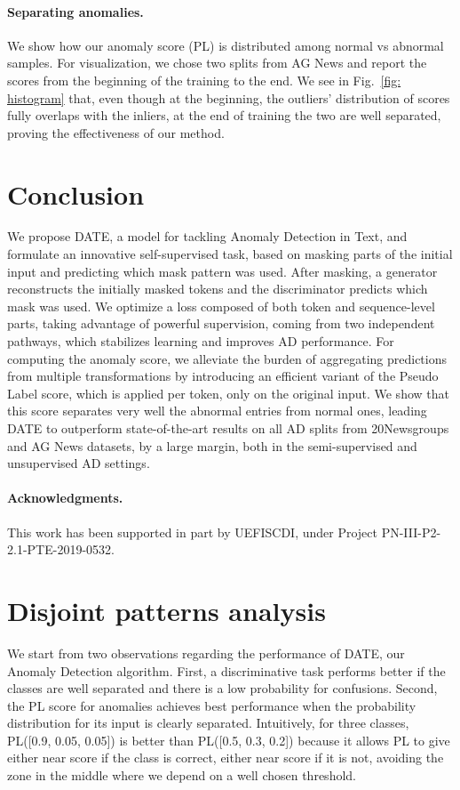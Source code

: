 \documentclass[11pt]{article}
\begin{document}
\paragraph{Separating anomalies.} We show how our anomaly score (PL) is distributed among normal vs abnormal samples. For visualization, we chose two splits from AG News and report the scores from the beginning of the training to the end. We see in Fig.~\ref{fig: histogram} that, even though at the beginning, the outliers' distribution of scores fully overlaps with the inliers, at the end of training the two are well separated, proving the effectiveness of our method.


\section{Conclusion}
We propose DATE, a model for tackling Anomaly Detection in Text, and formulate an innovative self-supervised task, based on masking parts of the initial input and predicting which mask pattern was used. After masking, a generator reconstructs the initially masked tokens and the discriminator predicts which mask was used.
We optimize a loss composed of both token and sequence-level parts, taking advantage of powerful supervision, coming from two independent pathways, which stabilizes learning and improves AD performance.
For computing the anomaly score, we alleviate the burden of aggregating predictions from multiple transformations by introducing an efficient variant of the Pseudo Label score, which is applied per token, only on the original input.
We show that this score separates very well the abnormal entries from normal ones, leading DATE to outperform state-of-the-art results on all AD splits from 20Newsgroups and AG News datasets, by a large margin, both in the semi-supervised and unsupervised AD settings.

\paragraph{Acknowledgments.} This work has been supported in part by UEFISCDI, under Project PN-III-P2-2.1-PTE-2019-0532.

\clearpage






\appendix

\section{Disjoint patterns analysis}
\label{apx:disjoint_patterns}
We start from two observations regarding the performance of DATE, our Anomaly Detection algorithm. First, a discriminative task performs better if the classes are well separated \cite{Deng2012} and there is a low probability for confusions. Second, the PL score for anomalies achieves best performance when the probability distribution for its input is clearly separated. Intuitively, for three classes, PL([0.9, 0.05, 0.05]) is better than PL([0.5, 0.3, 0.2]) because it allows PL to give either near  score if the class is correct, either near  score if it is not, avoiding the zone in the middle where we depend on a well chosen threshold.
\end{document}
